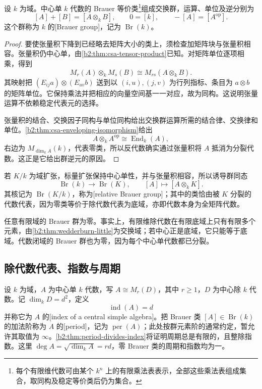 \begin{theorem}\label{b2:thm:brauer-group}
	设 \(k\) 为域。中心单 \(k\) 代数的 Brauer 等价类\footnote{每个有限维代数可由某个 \(k^n\) 上的有限乘法表表示，全部这些乘法表组成集合，取同构及稳定等价类后仍为集合。}组成交换群，运算、单位及逆分别为
	\[
		[A]+[B]=[A\otimes_k B],\qquad 0=[k],\qquad -[A]=[A^{\mathrm{op}}].
	\]
	这个群称为 \(k\) 的[Brauer group]，记为 \(\operatorname{Br}(k)\)。
\end{theorem}
\begin{proof}
	要使张量积下降到已经略去矩阵大小的类上，须检查加矩阵块与张量积相容。张量积仍中心单，由\cref{b2:thm:csa-tensor-product}已知。对矩阵单位逐项相乘，得到
	\[
		M_r(A)\otimes_k M_s(B)\cong M_{rs}(A\otimes_k B).
	\]
	其映射把 \((E_{ij}a)\otimes(E_{uv}b)\) 送到以 \((i,u),(j,v)\) 为行列指标、条目为 \(a\otimes b\) 的矩阵单位。它保持乘法并把相应的向量空间基一一对应，故为同构。这说明张量运算不依赖稳定代表元的选择。

	张量积的结合、交换因子同构与单位同构给出交换群运算所需的结合律、交换律和单位。\cref{b2:thm:csa-enveloping-isomorphism}给出
	\[
		A\otimes_k A^{\mathrm{op}}\cong\operatorname{End}_k(A),
	\]
	右边为 \(M_{\dim_kA}(k)\)，代表零类，所以反代数确实通过张量积将 \(A\) 抵消为分裂代数。这正是它给出群逆元的原因。
\end{proof}

若 \(K/k\) 为域扩张，标量扩张保持中心单性，并与张量积相容，所以诱导群同态
\[
	\operatorname{Br}(k)\longrightarrow\operatorname{Br}(K),\qquad [A]\longmapsto[A\otimes_kK].
\]
其核记为 \(\operatorname{Br}(K/k)\)，称为[relative Brauer group]；其中的类恰由被 \(K\) 分裂的代数代表，因为零类等价于除代数代表为底域，亦即代数本身为全矩阵代数。

\ProseParagraphBreak
任意有限域的 Brauer 群为零。事实上，有限维除代数在有限底域上只有有限多个元素，由\cref{b2:thm:wedderburn-little}为交换域；若中心正是底域，它只能等于底域。代数闭域的 Brauer 群也为零，因为每个中心单代数都已分裂。

\subsection{除代数代表、指数与周期}
\label{b2:subsec:1801:03}

\begin{definition}\label{b2:def:brauer-index-period}
	设 \(k\) 为域，\(A\) 为中心单 \(k\) 代数，写 \(A\cong M_r(D)\)，其中 \(r\geq1\)，\(D\) 为中心除 \(k\) 代数。记 \(\dim_kD=d^2\)，定义
	\[
		\operatorname{ind}(A)=d
	\]
	并称它为 \(A\) 的[index of a central simple algebra]。把 Brauer 类 \([A]\in\operatorname{Br}(k)\) 的加法阶称为 \(A\) 的[period]，记为 \(\operatorname{per}(A)\)；此处按群元素阶的通常约定，暂允许其取值为 \(\infty\)。\cref{b2:thm:period-divides-index}将证明周期总是有限的，且整除指数。这里 \(\deg A=\sqrt{\dim_k A}=rd\)，零 Brauer 类的周期和指数均为一。
\end{definition}


